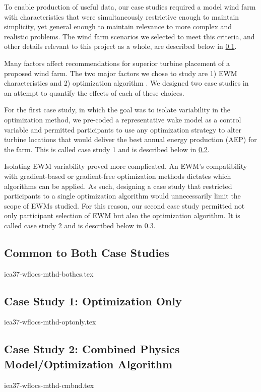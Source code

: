 
To enable production of useful data, our case studies required a model wind farm with characteristics that were simultaneously restrictive enough to maintain simplicity, yet general enough to maintain relevance to more complex and realistic problems.
The wind farm scenarios we selected to meet this criteria, and other details relevant to this project as a whole, are described below in \cref{sec:windfarm}.

Many factors affect recommendations for superior turbine placement of a proposed wind farm.
The two major factors we chose to study are
1) EWM characteristics and 2) optimization algorithm \cite{HerbertAcero2014}.
We designed two case studies in an attempt to quantify the effects of each of these choices.

For the first case study, in which the goal was to isolate variability in the optimization method, we pre-coded a representative wake model as a control variable
and permitted participants to use any optimization strategy to alter turbine locations that would deliver the best annual energy production (AEP) for the farm.
This is called case study 1 and is described below in \cref{sec:optonly}.

Isolating EWM variability proved more complicated.
An EWM's compatibility with gradient-based or gradient-free optimization methods dictates which algorithms can be applied.
As such, designing a case study that restricted participants to a single optimization algorithm would unnecessarily limit the scope of EWMs studied.
For this reason, our second case study permitted not only participant selection of EWM but also the optimization algorithm.
It is called case study 2 and is described below in \cref{sec:cmbnd}.

\bigskip
\subsection{Common to Both Case Studies} \label{sec:windfarm}

	{iea37-wflocs-mthd-bothcs.tex}
	
\subsection{Case Study 1: Optimization Only} \label{sec:optonly}

	{iea37-wflocs-mthd-optonly.tex}

\subsection{Case Study 2: Combined Physics Model/Optimization Algorithm} \label{sec:cmbnd}

	{iea37-wflocs-mthd-cmbnd.tex}
